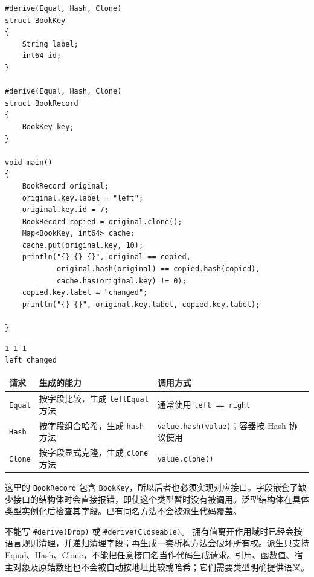 \par
\medskip
\begin{lstlisting}[style=chali]
#derive(Equal, Hash, Clone)
struct BookKey
{
    String label;
    int64 id;
}

#derive(Equal, Hash, Clone)
struct BookRecord
{
    BookKey key;
}

void main()
{
    BookRecord original;
    original.key.label = "left";
    original.key.id = 7;
    BookRecord copied = original.clone();
    Map<BookKey, int64> cache;
    cache.put(original.key, 10);
    println("{} {} {}", original == copied,
            original.hash(original) == copied.hash(copied),
            cache.has(original.key) != 0);
    copied.key.label = "changed";
    println("{} {}", original.key.label, copied.key.label);

}
\end{lstlisting}
\par
\medskip

\par
\medskip
\begin{lstlisting}[style=out]
1 1 1
left changed
\end{lstlisting}
\par
\medskip

\begin{center}
\begin{tabular}{lll}
\toprule
请求 & 生成的能力 & 调用方式 \\
\midrule
\texttt{Equal} & 按字段比较，生成 \texttt{left\allowbreak{}Equal} 方法 & 通常使用 \texttt{left =\allowbreak{}=\allowbreak{} right} \\
\texttt{Hash} & 按字段组合哈希，生成 \texttt{hash} 方法 & \texttt{value.\allowbreak{}hash(\allowbreak{}value)\allowbreak{}}；容器按 Hash 协议使用 \\
\texttt{Clone} & 按字段显式克隆，生成 \texttt{clone} 方法 & \texttt{value.\allowbreak{}clone(\allowbreak{})\allowbreak{}} \\
\bottomrule
\end{tabular}
\end{center}

这里的 \texttt{Book\allowbreak{}Record} 包含 \texttt{Book\allowbreak{}Key}，所以后者也必须实现对应接口。字段嵌套了缺少接口的结构体时会直接报错，即使这个类型暂时没有被调用。泛型结构体在具体类型实例化后检查其字段。已有同名方法不会被派生代码覆盖。

不能写 \texttt{\#derive(\allowbreak{}Drop)\allowbreak{}} 或 \texttt{\#derive(\allowbreak{}Closeable)\allowbreak{}}。 拥有值离开作用域时已经会按语言规则清理，并递归清理字段；再生成一套析构方法会破坏所有权。派生只支持 Equal、Hash、Clone，不能把任意接口名当作代码生成请求。引用、函数值、宿主对象及原始数组也不会被自动按地址比较或哈希；它们需要类型明确提供语义。

